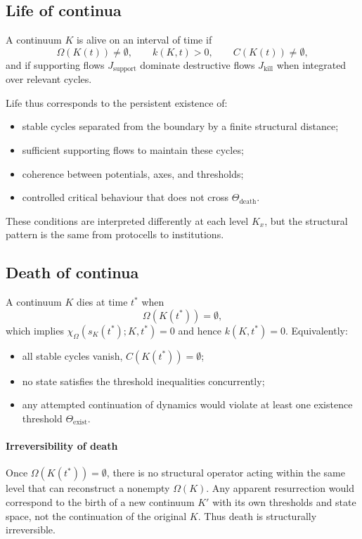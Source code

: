 \subsection{Life of continua}

A continuum \(K\) is alive on an interval of time if
\[
    \Omega(K(t)) \neq \emptyset,\qquad
    k(K,t) > 0,\qquad
    C(K(t)) \neq \emptyset,
\]
and if supporting flows \(J_{\mathrm{support}}\) dominate destructive flows \(J_{\mathrm{kill}}\) when integrated over relevant cycles.

Life thus corresponds to the persistent existence of:
\begin{itemize}
    \item stable cycles separated from the boundary by a finite structural distance;
    \item sufficient supporting flows to maintain these cycles;
    \item coherence between potentials, axes, and thresholds;
    \item controlled critical behaviour that does not cross \(\Theta_{\mathrm{death}}\).
\end{itemize}

These conditions are interpreted differently at each level \(K_x\), but the structural pattern is the same from protocells to institutions.

\subsection{Death of continua}

A continuum \(K\) dies at time \(t^\ast\) when
\[
    \Omega(K(t^\ast)) = \emptyset,
\]
which implies \(\chi_{\Omega}(s_K(t^\ast);K,t^\ast)=0\) and hence \(k(K,t^\ast)=0\).
Equivalently:
\begin{itemize}
    \item all stable cycles vanish, \(C(K(t^\ast)) = \emptyset\);
    \item no state satisfies the threshold inequalities concurrently;
    \item any attempted continuation of dynamics would violate at least one existence threshold \(\Theta_{\mathrm{exist}}\).
\end{itemize}

\paragraph{Irreversibility of death}
Once \(\Omega(K(t^\ast)) = \emptyset\), there is no structural operator acting within the same level that can reconstruct a nonempty \(\Omega(K)\).
Any apparent resurrection would correspond to the birth of a new continuum \(K'\) with its own thresholds and state space, not the continuation of the original \(K\).
Thus death is structurally irreversible.

